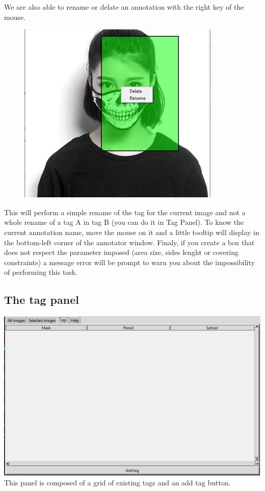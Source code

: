 \documentclass[a4paper, 11pt]{article}
\begin{document}
We are also able to rename or delate an annotation with the right key of the mouse. 
\begin{figure}
  \includegraphics{images_latex/delate_rename.jpg}
\end{figure}
This will perform a simple rename of the tag for the current image and not a whole rename of a tag A in tag B (you can do it in Tag Panel).
To know the current annotation name, move the mouse on it and a little tooltip will display in the bottom-left corner of the annotator window.
Finaly, if you create a box that does not respect the parameter imposed (area size, sides lenght or covering constraints) a message error will be prompt to warn you about the impossibility of performing this task.
\subsection{The tag panel}

\includegraphics[scale=0.9]{images_latex/tag_panel.jpg}
This panel is composed of a grid of existing tags and an add tag button.
\end{document}
